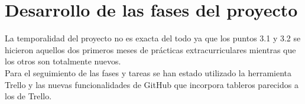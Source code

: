 \chapter{Desarrollo de las fases del proyecto}
\graphicspath{{imagenes/estructura_y_desarrollo/}}

La temporalidad del proyecto no es exacta del todo ya que los puntos 3.1 y 3.2 se hicieron aquellos dos primeros meses de prácticas extracurriculares mientras que los otros son totalmente nuevos. 
\\Para el seguimiento de las fases y tareas se han estado utilizado la herramienta Trello y las nuevas funcionalidades de GitHub que incorpora tableros parecidos a los de Trello.





